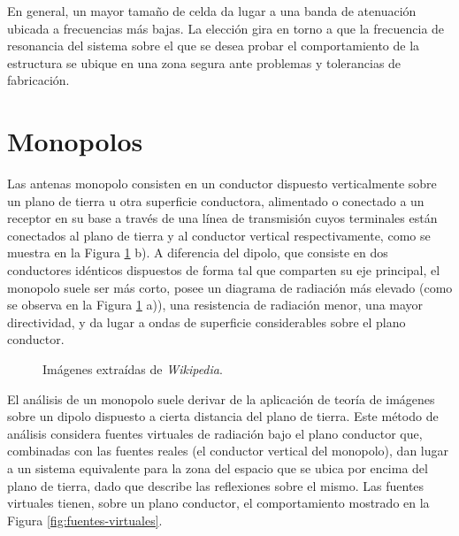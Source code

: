 
En general, un mayor tamaño de celda da lugar a una banda de atenuación ubicada a frecuencias más bajas. La elección gira en torno a que la frecuencia de resonancia del sistema sobre el que se desea probar el comportamiento de la estructura se ubique en una zona segura ante problemas y tolerancias de fabricación.

\section{Monopolos}

Las antenas monopolo consisten en un conductor dispuesto verticalmente sobre un plano de tierra u otra superficie conductora, alimentado o conectado a un receptor en su base a través de una línea de transmisión cuyos terminales están conectados al plano de tierra y al conductor vertical respectivamente, como se muestra en la Figura \ref{fig:monopolos} b). A diferencia del dipolo, que consiste en dos conductores idénticos dispuestos de forma tal que comparten su eje principal, el monopolo suele ser más corto, posee un diagrama de radiación más elevado (como se observa en la Figura \ref{fig:monopolos} a)), una resistencia de radiación menor, una mayor directividad, y da lugar a ondas de superficie considerables sobre el plano conductor.


\begin{figure}[H]
	\centering 
	\hspace{30pt}
	\caption{Imágenes extraídas de \textit{Wikipedia}.}
	\label{fig:monopolos}
\end{figure}


El análisis de un monopolo suele derivar de la aplicación de teoría de imágenes sobre un dipolo dispuesto a cierta distancia del plano de tierra. Este método de análisis considera fuentes virtuales de radiación bajo el plano conductor que, combinadas con las fuentes reales (el conductor vertical del monopolo), dan lugar a un sistema equivalente para la zona del espacio que se ubica por encima del plano de tierra, dado que describe las reflexiones sobre el mismo. Las fuentes virtuales tienen, sobre un plano conductor, el comportamiento mostrado en la Figura \ref{fig:fuentes-virtuales}.


